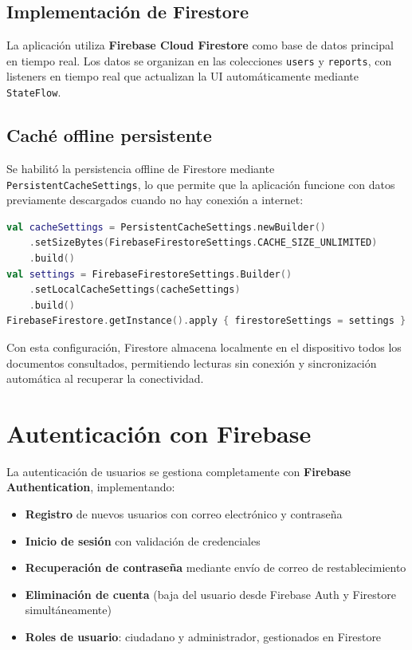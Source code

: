 \documentclass[12pt,a4paper]{article}
\begin{document}
\subsection{Implementación de Firestore}

La aplicación utiliza \textbf{Firebase Cloud Firestore} como base de datos principal en tiempo real. Los datos se organizan en las colecciones \texttt{users} y \texttt{reports}, con listeners en tiempo real que actualizan la UI automáticamente mediante \texttt{StateFlow}.

\subsection{Caché offline persistente}

Se habilitó la persistencia offline de Firestore mediante \texttt{PersistentCacheSettings}, lo que permite que la aplicación funcione con datos previamente descargados cuando no hay conexión a internet:

\begin{lstlisting}[language=Kotlin, caption={Configuración de caché persistente en FirebaseModule.kt}]
val cacheSettings = PersistentCacheSettings.newBuilder()
    .setSizeBytes(FirebaseFirestoreSettings.CACHE_SIZE_UNLIMITED)
    .build()
val settings = FirebaseFirestoreSettings.Builder()
    .setLocalCacheSettings(cacheSettings)
    .build()
FirebaseFirestore.getInstance().apply { firestoreSettings = settings }
\end{lstlisting}

Con esta configuración, Firestore almacena localmente en el dispositivo todos los documentos consultados, permitiendo lecturas sin conexión y sincronización automática al recuperar la conectividad.

\section{Autenticación con Firebase}

La autenticación de usuarios se gestiona completamente con \textbf{Firebase Authentication}, implementando:

\begin{itemize}[leftmargin=1.5em]
    \item \textbf{Registro} de nuevos usuarios con correo electrónico y contraseña
    \item \textbf{Inicio de sesión} con validación de credenciales
    \item \textbf{Recuperación de contraseña} mediante envío de correo de restablecimiento
    \item \textbf{Eliminación de cuenta} (baja del usuario desde Firebase Auth y Firestore simultáneamente)
    \item \textbf{Roles de usuario}: ciudadano y administrador, gestionados en Firestore
\end{itemize}
\end{document}
